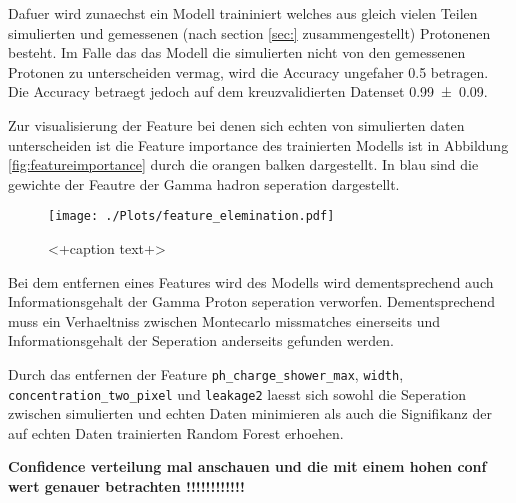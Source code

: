 Dafuer wird zunaechst ein Modell traininiert welches aus gleich vielen Teilen simulierten und gemessenen (nach section \ref{sec:} zusammengestellt) Protonenen besteht. 
Im Falle das das Modell die simulierten nicht von den gemessenen Protonen zu unterscheiden vermag, wird die Accuracy ungefaher 0.5 betragen. 
Die Accuracy betraegt jedoch auf dem kreuzvalidierten Datenset \num{0.99(9)}. 

Zur visualisierung der Feature bei denen sich echten von simulierten daten unterscheiden ist die Feature importance des trainierten Modells ist in Abbildung \ref{fig:featureimportance} durch die orangen balken dargestellt. 
In blau sind die gewichte der Feautre der Gamma hadron seperation dargestellt. 
\begin{figure}[H]
  \centering
  \texttt{[image: ./Plots/feature\_elemination.pdf]}
  \caption{<+caption text+>}
  \label{fig:<+label+>}
\end{figure}
Bei dem entfernen eines Features wird des Modells wird dementsprechend auch Informationsgehalt der Gamma Proton seperation verworfen. 
Dementsprechend muss ein Verhaeltniss zwischen Montecarlo missmatches einerseits und Informationsgehalt der Seperation anderseits gefunden werden.

Durch das entfernen der Feature \texttt{ph\_charge\_shower\_max}, \texttt{width}, \texttt{concentration\_two\_pixel} und \texttt{leakage2} laesst sich sowohl die Seperation zwischen simulierten und echten Daten minimieren als auch die Signifikanz der auf echten Daten trainierten Random Forest erhoehen.

\textbf{Confidence verteilung mal anschauen und die mit einem hohen conf wert genauer betrachten !!!!!!!!!!!!}
